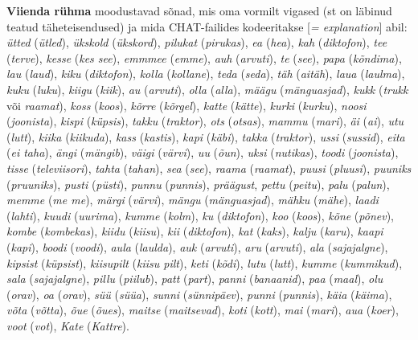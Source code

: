 \documentclass[12pt]{article}
\begin{document}
\textbf{Viienda rühma} moodustavad sõnad, mis oma vormilt vigased (st on läbinud teatud täheteisendused) ja mida CHAT-failides kodeeritakse [\emph{= explanation}] abil: \emph{ütted} (\emph{ütled}), \emph{ükskold} (\emph{ükskord}), \emph{pilukat} (\emph{pirukas}), \emph{ea} (\emph{hea}), \emph{kah} (\emph{diktofon}), \emph{tee} (\emph{terve}), \emph{kesse} (\emph{kes see}), \emph{emmmee} (\emph{emme}), \emph{auh} (\emph{arvuti}), \emph{te} (\emph{see}), \emph{papa} (\emph{kõndima}), \emph{lau} (\emph{laud}), \emph{kiku} (\emph{diktofon}), \emph{kolla} (\emph{kollane}), \emph{teda} (\emph{seda}), \emph{täh} (\emph{aitäh}), \emph{laua} (\emph{laulma}), \emph{kuku} (\emph{luku}), \emph{kiigu} (\emph{kiik}), \emph{au} (\emph{arvuti}), \emph{olla} (\emph{alla}), \emph{määgu} (\emph{mänguasjad}), \emph{kukk} (\emph{trukk} või \emph{raamat}), \emph{koss} (\emph{koos}), \emph{kõrre} (\emph{kõrgel}), \emph{katte} (\emph{kätte}), \emph{kurki} (\emph{kurku}), \emph{noosi} (\emph{joonista}), \emph{kispi} (\emph{küpsis}), \emph{takku} (\emph{traktor}), \emph{ots} (\emph{otsas}), \emph{mammu} (\emph{mari}), \emph{äi} (\emph{ai}), \emph{utu} (\emph{lutt}), \emph{kiika} (\emph{kiikuda}), \emph{kass} (\emph{kastis}), \emph{kapi} (\emph{käbi}), \emph{takka} (\emph{traktor}), \emph{ussi} (\emph{sussid}), \emph{eita} (\emph{ei taha}), \emph{ängi} (\emph{mängib}), \emph{väigi} (\emph{värvi}), \emph{uu} (\emph{õun}), \emph{uksi} (\emph{nutikas}), \emph{toodi} (\emph{joonista}), \emph{tisse} (\emph{televiisori}), \emph{tahta} (\emph{tahan}), \emph{sea} (\emph{see}), \emph{raama} (\emph{raamat}), \emph{puusi} (\emph{pluusi}), \emph{puuniks} (\emph{pruuniks}), \emph{pusti} (\emph{püsti}), \emph{punnu} (\emph{punnis}), \emph{präägust}, \emph{pettu} (\emph{peitu}), \emph{palu} (\emph{palun}), \emph{memme} (\emph{me me}), \emph{märgi} (\emph{värvi}), \emph{mängu} (\emph{mänguasjad}), \emph{mähku} (\emph{mähe}), \emph{laadi} (\emph{lahti}), \emph{kuudi} (\emph{uurima}), \emph{kumme} (\emph{kolm}), \emph{ku} (\emph{diktofon}), \emph{koo} (\emph{koos}), \emph{kõne} (\emph{põnev}), \emph{kombe} (\emph{kombekas}), \emph{kiidu} (\emph{kiisu}), \emph{kii} (\emph{diktofon}), \emph{kat} (\emph{kaks}), \emph{kalju} (\emph{karu}), \emph{kaapi} (\emph{kapi}), \emph{boodi} (\emph{voodi}), \emph{aula} (\emph{laulda}), \emph{auk} (\emph{arvuti}), \emph{aru} (\emph{arvuti}), \emph{ala} (\emph{sajajalgne}), \emph{kipsist} (\emph{küpsist}), \emph{kiisupilt} (\emph{kiisu pilt}), \emph{keti} (\emph{kõdi}), \emph{lutu} (\emph{lutt}), \emph{kumme} (\emph{kummikud}), \emph{sala} (\emph{sajajalgne}), \emph{pillu} (\emph{piilub}), \emph{patt} (\emph{part}), \emph{panni} (\emph{banaanid}), \emph{paa} (\emph{maal}), \emph{olu} (\emph{orav}), \emph{oa} (\emph{orav}), \emph{süü} (\emph{süüa}), \emph{sunni} (\emph{sünnipäev}), \emph{punni} (\emph{punnis}), \emph{käia} (\emph{käima}), \emph{võta} (\emph{võtta}), \emph{õue} (\emph{õues}), \emph{maitse} (\emph{maitsevad}), \emph{koti} (\emph{kott}), \emph{mai} (\emph{mari}), \emph{aua} (\emph{koer}), \emph{voot} (\emph{vot}), \emph{Kate} (\emph{Kattre}).
\end{document}

